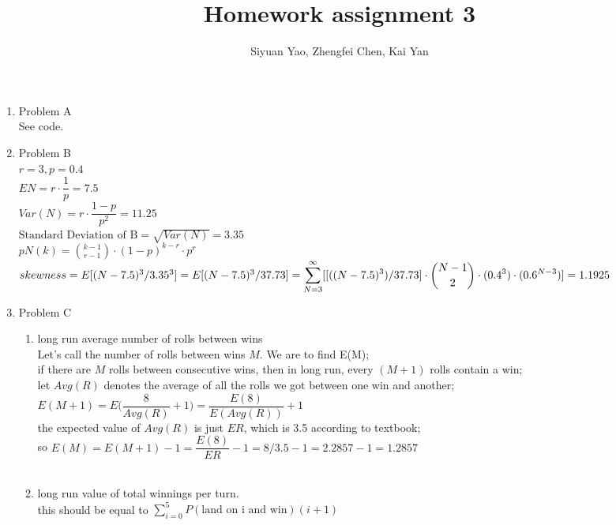 \documentclass{amsart}
\begin{document}
\title{Homework assignment 3}
\author{Siyuan Yao, Zhengfei Chen, Kai Yan}
\maketitle

\thispagestyle{empty}
\pagestyle{empty}

\begin{enumerate}
\item Problem A\\
See code.
\item Problem B\\
$r = 3, p = 0.4$\\
$EN = r\cdot \dfrac{1}{p}=7.5$\\
$Var(N) = r\cdot \dfrac{1-p}{p^2}=11.25$\\
$\text{Standard Deviation of B} = \sqrt{Var(N)}= 3.35$\\
$pN(k) = \displaystyle\binom{k-1}{r-1}\cdot(1-p)^{k-r}\cdot p^r$\\
$skewness = E[(N-7.5)^3 / 3.35^3] = E[(N-7.5)^3/37.73] \\= \displaystyle\sum^\infty_{N=3}[ [((N-7.5)^3) / 37.73]\cdot \binom{N-1}{2} \cdot(0.4^3) \cdot (0.6 ^ {N-3} ) ]= 1.1925$
\item Problem C\\
\begin{enumerate}
\item long run average number of rolls between wins\\
 Let's call the number of rolls between wins $M$. We are to find E(M);\\
  if there are $M$ rolls between consecutive wins, then in long run, every $(M+1)$ rolls contain a win;\\
  let $Avg(R)$ denotes the average of all the rolls we got between one win and another;\\
  $E(M+1) = E\bigg(\dfrac{8}{Avg(R)}+1\bigg)=\dfrac{E(8)}{ E(Avg(R))} +1$\\
  the expected value of $Avg(R)$ is just $ER$, which is 3.5 according to textbook;\\
so $E(M) = E(M+1) -1 = \dfrac{E(8)}{ER} -1 = 8/3.5 -1 = 2.2857 -1 = 1.2857$\\\\
\item long run value of total winnings per turn. \\
  this should be equal to $\displaystyle\sum^5_{i=0}P(\text{land on i and win})(i+1)$\\

\end{enumerate}
\end{enumerate}
\end{document}
